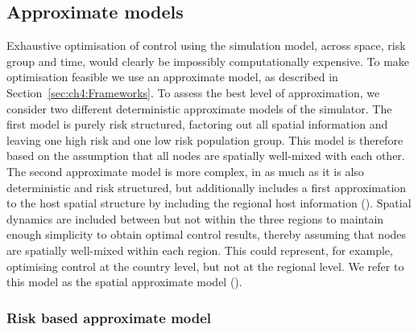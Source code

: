 \subsection{Approximate models}

Exhaustive optimisation of control using the simulation model, across space, risk group and time, would clearly be impossibly computationally expensive. To make optimisation feasible we use an approximate model, as described in Section~\ref{sec:ch4:Frameworks}. To assess the best level of approximation, we consider two different deterministic approximate models of the simulator. The first model is purely risk structured, factoring out all spatial information and leaving one high risk and one low risk population group. This model is therefore based on the assumption that all nodes are spatially well-mixed with each other. The second approximate model is more complex, in as much as it is also deterministic and risk structured, but additionally includes a first approximation to the host spatial structure by including the regional host information (). Spatial dynamics are included between but not within the three regions to maintain enough simplicity to obtain optimal control results, thereby assuming that nodes are spatially well-mixed within each region. This could represent, for example, optimising control at the country level, but not at the regional level. We refer to this model as the spatial approximate model ().

\subsubsection*{Risk based approximate model}

